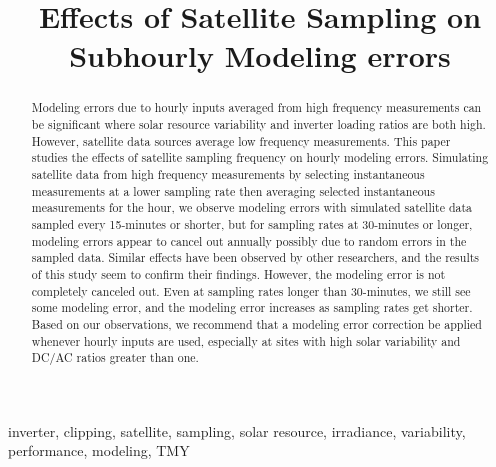 \documentclass[conference]{IEEEtran}
\begin{document}
\title{Effects of Satellite Sampling on Subhourly Modeling errors}

\author{
}

\maketitle

\begin{abstract}
Modeling errors due to hourly inputs averaged from high frequency measurements can be significant where solar resource variability and inverter loading ratios are both high. However, satellite data sources average low frequency measurements. This paper studies the effects of satellite sampling frequency on hourly modeling errors. Simulating satellite data from high frequency measurements by selecting instantaneous measurements at a lower sampling rate then averaging selected instantaneous measurements for the hour, we observe modeling errors with simulated satellite data sampled every 15-minutes or shorter, but for sampling rates at 30-minutes or longer, modeling errors appear to cancel out annually possibly due to random errors in the sampled data. Similar effects have been observed by other researchers, and the results of this study seem to confirm their findings. However, the modeling error is not completely canceled out. Even at sampling rates longer than 30-minutes, we still see some modeling error, and the modeling error increases as sampling rates get shorter. Based on our observations, we recommend that a modeling error correction be applied whenever hourly inputs are used, especially at sites with high solar variability and DC/AC ratios greater than one.
\end{abstract}

\begin{IEEEkeywords}
inverter, clipping, satellite, sampling, solar resource, irradiance, variability, performance, modeling, TMY
\end{IEEEkeywords}
\end{document}
